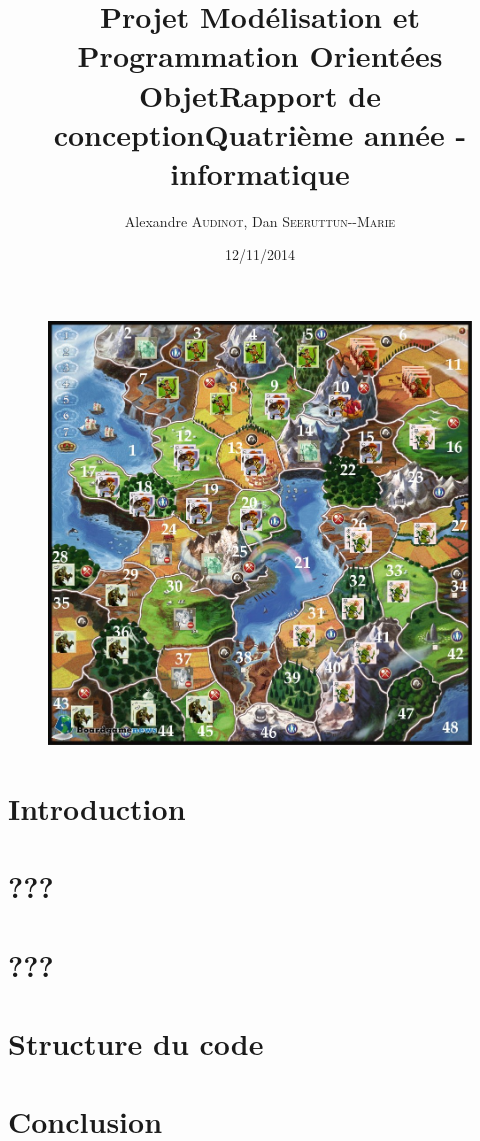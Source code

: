 \documentclass[12pt]{article}
\title{Projet Modélisation et Programmation Orientées Objet\smallbreak Rapport de conception\smallbreak Quatrième année - informatique }
\author{Alexandre \textsc{Audinot},  Dan \textsc{Seeruttun-{}-Marie}}
\date{12/11/2014}
\begin{document}
\maketitle

\begin{figure}[!h] 
\centerline{\includegraphics[scale=0.30]{img/cover.jpg}}
\end{figure}
\newpage

\newpage
\tableofcontents
\newpage


\section{Introduction}

\newpage
\section{???}

\newpage
\section{???}

\newpage
\section{Structure du code}

\newpage
\section{Conclusion}

\end{document}
